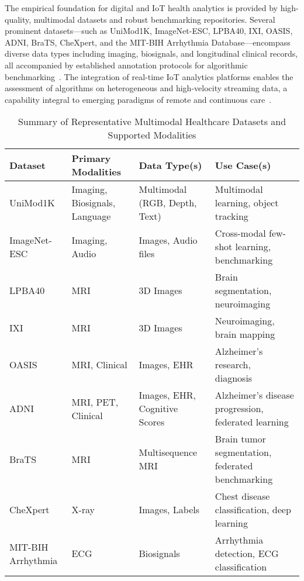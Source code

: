 \documentclass[sigconf]{acmart}
\begin{document}
The empirical foundation for digital and IoT health analytics is provided by high-quality, multimodal datasets and robust benchmarking repositories. Several prominent datasets---such as UniMod1K, ImageNet-ESC, LPBA40, IXI, OASIS, ADNI, BraTS, CheXpert, and the MIT-BIH Arrhythmia Database---encompass diverse data types including imaging, biosignals, and longitudinal clinical records, all accompanied by established annotation protocols for algorithmic benchmarking~\cite{ref35,ref43,ref48,ref49,ref50,ref51,ref58,ref66,ref67,ref74,ref75,ref88,ref89,ref90,ref101,ref106}. The integration of real-time IoT analytics platforms enables the assessment of algorithms on heterogeneous and high-velocity streaming data, a capability integral to emerging paradigms of remote and continuous care~\cite{ref67,ref106}.

\begin{table*}[htbp]
\centering
\caption{Summary of Representative Multimodal Healthcare Datasets and Supported Modalities}
\label{tab:dataset_overview}
\begin{adjustbox}{max width=\textwidth}
\begin{tabular}{@{}llll@{}}
\toprule
\textbf{Dataset} & \textbf{Primary Modalities} & \textbf{Data Type(s)} & \textbf{Use Case(s)} \\
\midrule
UniMod1K & Imaging, Biosignals, Language & Multimodal (RGB, Depth, Text) & Multimodal learning, object tracking~\cite{ref35} \\
ImageNet-ESC & Imaging, Audio & Images, Audio files & Cross-modal few-shot learning, benchmarking~\cite{ref43} \\
LPBA40 & MRI & 3D Images & Brain segmentation, neuroimaging~\cite{ref48} \\
IXI & MRI & 3D Images & Neuroimaging, brain mapping~\cite{ref48} \\
OASIS & MRI, Clinical & Images, EHR & Alzheimer’s research, diagnosis~\cite{ref48} \\
ADNI & MRI, PET, Clinical & Images, EHR, Cognitive Scores & Alzheimer’s disease progression, federated learning~\cite{ref51} \\
BraTS & MRI & Multisequence MRI & Brain tumor segmentation, federated benchmarking~\cite{ref51} \\
CheXpert & X-ray & Images, Labels & Chest disease classification, deep learning~\cite{ref54} \\
MIT-BIH Arrhythmia & ECG & Biosignals & Arrhythmia detection, ECG classification~\cite{ref101} \\
\bottomrule
\end{tabular}
\end{adjustbox}
\end{table*}
\end{document}
